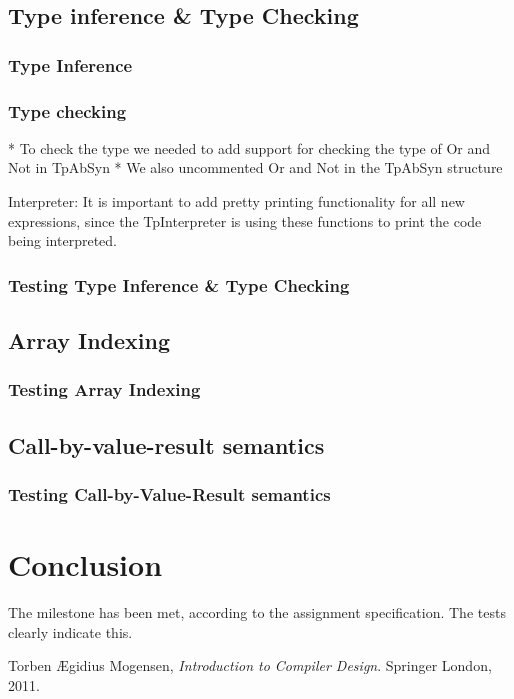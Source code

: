 \documentclass[10pt]{article}
\begin{document}
\subsection{Type inference \& Type Checking}
\subsubsection{Type Inference}
\subsubsection{Type checking}
* To check the type we needed to add support for checking the type of Or and Not in TpAbSyn
* We also uncommented Or and Not in the TpAbSyn structure

Interpreter:
It is important to add pretty printing functionality for all new expressions, since the TpInterpreter is using these functions to print the code being interpreted.
\subsubsection{Testing Type Inference \& Type Checking}
\subsection{Array Indexing}
\subsubsection{Testing Array Indexing}
\subsection{Call-by-value-result semantics}
\subsubsection{Testing Call-by-Value-Result semantics}

\section{Conclusion}
The milestone has been met, according to the assignment specification. The tests clearly indicate this.

\begin{thebibliography}{9}
Torben Ægidius Mogensen,
\emph{Introduction to Compiler Design}.
Springer London,
2011.

\end{thebibliography}


\end{document}
